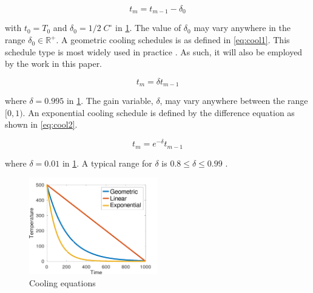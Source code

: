 \documentclass[11pt,a4paper,final]{article}
\newcommand{\Tau}{T}                        %
\begin{document}
\begin{equation}
\label{eq:cool0}
t_m = t_{m-1} - \delta_0
\end{equation}

with \(t_0 = \Tau_0\) and \(\delta_0 = 1/2\; C^\circ\) in \ref{fig:cool}. The value of \(\delta_0\) may vary anywhere in the range \(\delta_0 \in \mathbb{R}^+\). A
geometric cooling schedules is as defined in \ref{eq:cool1}. This schedule type is most widely used in practice
\cite{keller-2019-multi-objec}. As such, it will also be employed by the work in this paper.

\begin{equation}
\label{eq:cool1}
t_m = \delta t_{m-1}
\end{equation}

where \(\delta = 0.995\) in \ref{fig:cool}. The gain variable, \(\delta\), may vary anywhere between the range \([0,1)\). An exponential
cooling schedule is defined by the difference equation as shown in \ref{eq:cool2}.

\begin{equation}
\label{eq:cool2}
t_m = e^{-\delta}t_{m-1}
\end{equation}

where \(\delta = 0.01\) in \ref{fig:cool}. A typical range for \(\delta\) is \(0.8 \le \delta \le 0.99\) \cite{delahaye-2019-simul}.

\begin{figure}[htbp]
\centering
\includegraphics[width=0.5\textwidth]{sections/img/cool_func.png}
\caption{\label{fig:cool}Cooling equations}
\end{figure}
\end{document}
